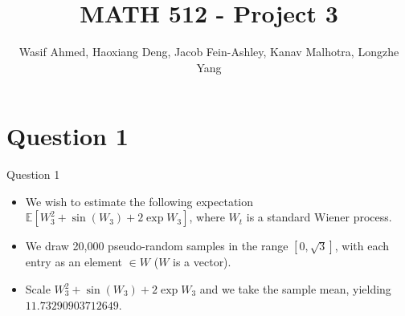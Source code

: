 \documentclass[compress,12pt]{beamer}
\title{MATH 512 - Project 3}
\subtitle{}
\date{}
\author{Wasif Ahmed, Haoxiang Deng, Jacob Fein-Ashley, Kanav Malhotra, Longzhe Yang}
\newcommand{\myRed}[1]{\textcolor{red}{#1}}
\begin{document}
\frame[plain]{\titlepage}

\section{Question 1}

      
      
\begin{frame}{Question 1}

    \begin{itemize}
        \item We wish to estimate the following expectation $\mathbb{E}[W_3^2 + \sin(W_3) + 2\exp{W_3}]$, where $W_t$ is a standard Wiener process.

        \item We draw 20,000 pseudo-random samples in the range $[0, \sqrt{3}]$, with each entry as an element $\in W$ ($W$ is a vector).

        \item Scale $W_3^2 + \sin(W_3) + 2\exp{W_3}$ and we take the sample mean, yielding $\boxed{11.73290903712649}$.

    \end{itemize}
    
\end{frame}
\end{document}
